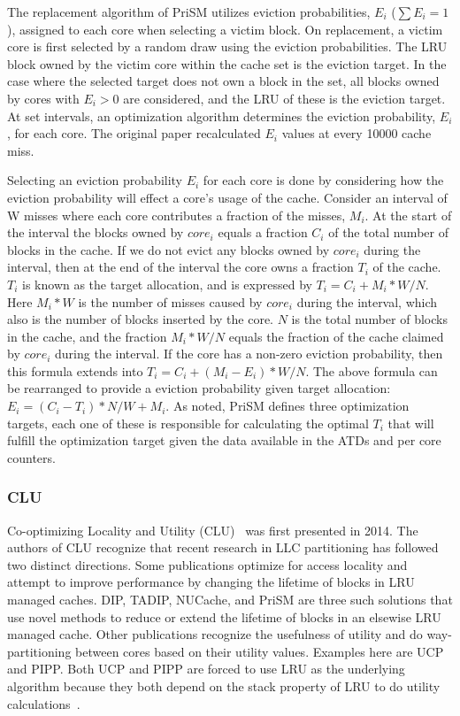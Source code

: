 The replacement algorithm of PriSM utilizes eviction probabilities, $E_i$ ($\sum{E_i} = 1$), assigned to each core when selecting a victim block.
On replacement, a victim core is first selected by a random draw using the eviction probabilities.
The LRU block owned by the victim core within the cache set is the eviction target.
In the case where the selected target does not own a block in the set, all blocks owned by cores with $E_i > 0$ are considered, and the LRU of these is the eviction target.
At set intervals, an optimization algorithm determines the eviction probability, $E_i$, for each core.
The original paper recalculated $E_i$ values at every 10000 cache miss.

Selecting an eviction probability $E_i$ for each core is done by considering how the eviction probability will effect a core's usage of the cache.
Consider an interval of W misses where each core contributes a fraction of the misses, $M_i$.
At the start of the interval the blocks owned by $core_i$ equals a fraction $C_i$ of the total number of blocks in the cache.
If we do not evict any blocks owned by $core_i$ during the interval, then at the end of the interval the core owns a fraction $T_i$ of the cache.
$T_i$ is known as the target allocation, and is expressed by $T_i = C_i + M_i * W/N$. 
Here $M_i * W$ is the number of misses caused by $core_i$ during the interval, which also is the number of blocks inserted by the core.
$N$ is the total number of blocks in the cache, and the fraction $M_i * W/N$ equals the fraction of the cache claimed by $core_i$ during the interval.
If the core has a non-zero eviction probability, then this formula extends into $T_i = C_i + (M_i - E_i) * W/N$.
The above formula can be rearranged to provide a eviction probability given target allocation: $E_i = (C_i - T_i) * N/W + M_i$.
As noted, PriSM defines three optimization targets, each one of these is responsible for calculating the optimal $T_i$ that will fulfill the optimization target given the data available in the ATDs and per core counters.

\subsubsection{CLU}

Co-optimizing Locality and Utility (CLU)~\cite{Zhan2014} was first presented in 2014.
The authors of CLU recognize that recent research in LLC partitioning has followed two distinct directions.
Some publications optimize for access locality and attempt to improve performance by changing the lifetime of blocks in LRU managed caches.
DIP, TADIP, NUCache, and PriSM are three such solutions that use novel methods to reduce or extend the lifetime of blocks in an elsewise LRU managed cache.
Other publications recognize the usefulness of utility and do way-partitioning between cores based on their utility values.
Examples here are UCP and PIPP.
Both UCP and PIPP are forced to use LRU as the underlying algorithm because they both depend on the stack property of LRU to do utility calculations~\cite{Qureshi2006, Xie2009}.

